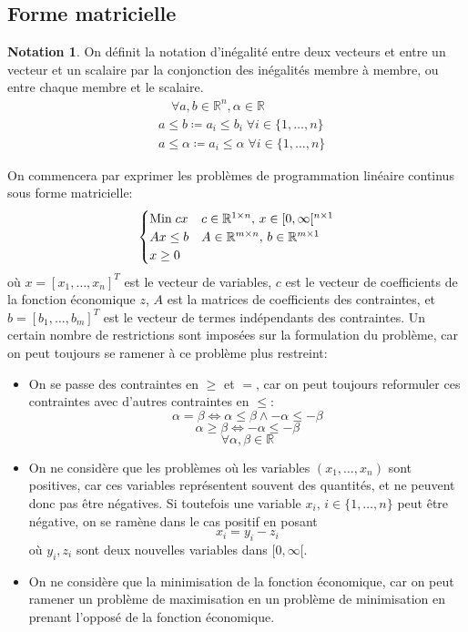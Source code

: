 \documentclass[a4paper]{report}
\theoremstyle{definition}
\newtheorem*{notation}{Notation}
\theoremstyle{remark}
\theoremstyle{plain}
\begin{document}
\subsection{Forme matricielle}
\begin{notation}
On définit la notation d'inégalité entre deux vecteurs et entre un vecteur et
un scalaire par la conjonction des inégalités membre à membre, ou entre chaque
membre et le scalaire.
\begin{align*}
	&\quad\forall a,b\in\mathbb{R}^n,\alpha\in\mathbb{R}\\
	&a\le b\coloneqq a_i\le b_i\;\forall i\in\{1,\dots,n\}\\
	&a\le \alpha\coloneqq a_i\le\alpha\;\forall i\in\{1,\dots,n\}
\end{align*}
\end{notation}
On commencera par exprimer les problèmes de programmation linéaire continus sous
forme matricielle:
\[\begin{cases}
	\text{Min\;} cx & c\in\mathbb{R}^{1\times n},\, x\in[0,\infty[^{n\times 1}\\
	Ax \le b        & A\in\mathbb{R}^{m\times n},\, b\in\mathbb{R}^{m\times 1}\\
	x \ge 0
\end{cases}\]
où \(x=[x_1,\dots,x_n]^T\) est le vecteur de variables, \(c\) est le vecteur de coefficients de
la fonction économique \(z\), \(A\) est la matrices de coefficients des
contraintes, et \(b=[b_1,\dots,b_m]^T\) est le vecteur de termes indépendants des contraintes.
Un certain nombre de restrictions sont imposées sur la formulation du problème,
car on peut toujours se ramener à ce problème plus restreint:
\begin{itemize}
	\item On se passe des contraintes en \(\ge\) et \(=\), car on peut
	toujours reformuler ces contraintes avec d'autres contraintes en \(\le\):
	\[\alpha=\beta\Leftrightarrow \alpha\le\beta\land-\alpha\le-\beta\]
	\[\alpha\ge\beta\Leftrightarrow-\alpha\le-\beta\]
	\[\forall\alpha,\beta\in\mathbb{R}\]

	\item On ne considère que les  problèmes où les variables
	\((x_1,\dots,x_n)\) sont positives, car ces variables
	représentent souvent des quantités, et ne peuvent donc pas être négatives.
	Si toutefois une variable \(x_i,\,i\in\{1,\dots,n\}\) peut être négative, on se
	ramène dans le cas positif en posant
	\[x_i=y_i-z_i\]
	où \(y_i,z_i\) sont deux nouvelles variables dans \([0,\infty[\).

	\item On ne considère que la minimisation de la fonction
	économique, car on peut ramener un problème de maximisation en un
	problème de minimisation en prenant l'opposé de la fonction économique.
\end{itemize}
\end{document}
